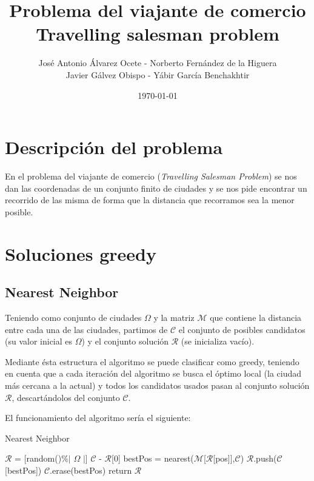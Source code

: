 \documentclass{article}
\title{Problema del viajante de comercio\\ Travelling salesman problem}
\author{José Antonio Álvarez Ocete - Norberto Fernández de la Higuera \\ Javier Gálvez Obispo - Yábir García Benchakhtir }
\date{\today}
\begin{document}
\maketitle
\newpage
\tableofcontents
\newpage

\section{Descripción del problema}

En el problema del viajante de comercio (\textit{Travelling Salesman
  Problem}) se nos dan las coordenadas de un conjunto finito de
ciudades y se nos pide encontrar un recorrido de las misma de forma
que la distancia que recorramos sea la menor posible.

\section{Soluciones greedy}

\subsection{Nearest Neighbor}

Teniendo como conjunto de ciudades $\Omega$ y la matriz $\mathcal{M}$ 
que contiene la distancia entre cada una de las ciudades, partimos de
$\mathcal{C}$  el conjunto de posibles candidatos (su valor inicial es
$\Omega$) y el conjunto solución $\mathcal{R}$ (se inicializa vacío).

Mediante ésta estructura el algoritmo se puede clasificar como greedy, 
teniendo en cuenta que a cada iteración del algoritmo se busca el óptimo 
local (la ciudad más cercana a la actual) y todos los candidatos usados 
pasan al conjunto solución $\mathcal{R}$, descartándolos del conjunto 
$\mathcal{C}$.


El funcionamiento del algoritmo sería el siguiente:

\begin{algorithm}[H]
\caption{Nearest Neighbor}
\begin{algorithmic}
\State $\mathcal{R}$ = [random()$\%|$ $\Omega$ $|$]
\State $\mathcal{C}$ - $\mathcal{R}$[0]
\State bestPos = nearest($\mathcal{M}$[$\mathcal{R}$[pos]],$\mathcal{C}$)
\State $\mathcal{R}$.push($\mathcal{C}$[bestPos])
\State $\mathcal{C}$.erase(bestPos)
\EndFor
\State return $\mathcal{R}$
\end{algorithmic}
\end{algorithm}
\end{document}

